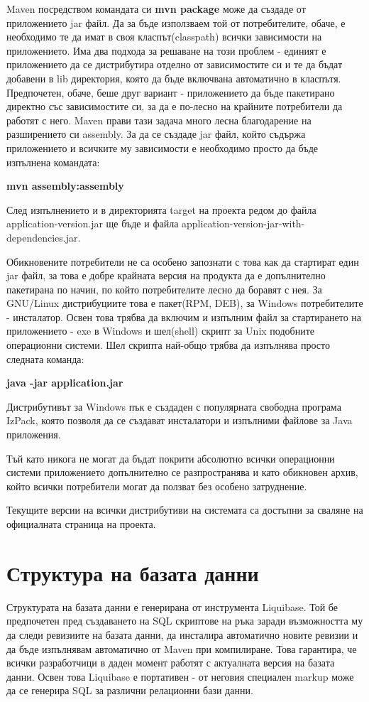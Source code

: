 Maven посредством командата си \textbf{mvn package} може да създаде от
приложението jar файл. Да за бъде използваем той от потребителите,
обаче, е необходимо те да имат в своя класпът(classpath) всички зависимости на
приложението. Има два подхода за решаване на този проблем - единият е
приложението да се дистрибутира отделно от зависимостите си и те да
бъдат добавени в lib директория, която да бъде включвана автоматично в
класпътя. Предпочетен, обаче, беше друг вариант - приложението да бъде
пакетирано директно със зависимостите си, за да е по-лесно на крайните
потребители да работят с него. Maven прави тази задача много лесна
благодарение на разширението си assembly. За да се създаде jar файл,
който съдържа приложението и всичките му зависимости е необходимо
просто да бъде изпълнена командата:

\textbf{mvn assembly:assembly}

След изпълнението и в директорията target на проекта редом до файла
application-version.jar ще бъде и файла
application-version-jar-with-dependencies.jar.

Обикновените потребители не са особено запознати с това как да
стартират един jar файл, за това е добре крайната версия на продукта
да е допълнително пакетирана по начин, по който потребителите лесно да
боравят с нея. За GNU/Linux дистрибуциите това е пакет(RPM, DEB), за
Windows потребителите - инсталатор. Освен това трябва да включим и
изпълним файл за стартирането на приложението - exe в Windows и шел(shell)
скрипт за Unix подобните операционни системи. Шел скрипта най-общо
трябва да изпълнява просто следната команда:

\textbf{java -jar application.jar}

Дистрибутивът за Windows пък е създаден с популярната свободна
програма IzPack, която позволя да се създават инсталатори и изпълними
файлове за Java приложения. 

Тъй като никога не могат да бъдат покрити абсолютно всички операционни
системи приложението допълнително се разпространява и като обикновен
архив, който всички потребители могат да ползват без особено
затруднение. 

Текущите версии на всички дистрибутиви на системата са достъпни за
сваляне на официалната страница на проекта.
\section{Структура на базата данни}

Структурата на базата данни е генерирана от инструмента Liquibase. Той
бе предпочетен пред създаването на SQL скриптове на ръка заради
възможността му да следи ревизиите на базата данни, да инсталира
автоматично новите ревизии и да бъде изпълнявам автоматично от Maven
при компилиране. Това гарантира, че всички разработчици в даден момент
работят с актуалната версия на базата данни. Освен това Liquibase е
портативен - от неговия специален markup може да се генерира SQL за
различни релационни бази данни.


